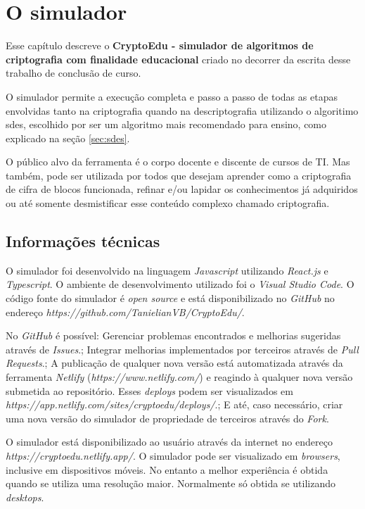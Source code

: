 \chapter{O simulador}
\label{char:ferrdesenvolvida}
Esse capítulo descreve o \textbf{CryptoEdu - simulador de algoritmos de criptografia com finalidade educacional} criado no decorrer da escrita desse trabalho de conclusão de curso.

O simulador permite a execução completa e passo a passo de todas as etapas envolvidas tanto na criptografia quando na descriptografia utilizando o algoritimo \acrfull{sdes}, escolhido por ser um algoritmo mais recomendado para ensino, como explicado na seção \ref{sec:sdes}.

O público alvo da ferramenta é o corpo docente e discente de cursos de TI. Mas também, pode ser utilizada por todos que desejam aprender como a criptografia de cifra de blocos funcionada, refinar e/ou lapidar os conhecimentos já adquiridos ou até somente desmistificar esse conteúdo complexo chamado criptografia.

\section{Informações técnicas}

O simulador foi desenvolvido na linguagem \textit{Javascript} utilizando \textit{React.js} e \textit{Typescript}. O ambiente de desenvolvimento utilizado foi o \textit{Visual Studio Code}. O código fonte do simulador é \textit{open source} e está disponibilizado no \textit{GitHub} no endereço \textit{https://github.com/TanielianVB/CryptoEdu/}.

No \textit{GitHub} é possível: Gerenciar problemas encontrados e melhorias sugeridas através de \textit{Issues}.; Integrar melhorias implementados por terceiros através de \textit{Pull Requests}.; A publicação de qualquer nova versão está automatizada através da ferramenta \textit{Netlify} (\textit{https://www.netlify.com/}) e reagindo à qualquer nova versão submetida ao repositório. Esses \textit{deploys} podem ser visualizados em \textit{https://app.netlify.com/sites/cryptoedu/deploys/}.; E até, caso necessário, criar uma nova versão do simulador de propriedade de terceiros através do \textit{Fork}.

O simulador está disponibilizado ao usuário através da internet no endereço \textit{https://cryptoedu.netlify.app/}. O simulador pode ser visualizado em \textit{browsers}, inclusive em dispositivos móveis. No entanto a melhor experiência é obtida quando se utiliza uma resolução maior. Normalmente só obtida se utilizando \textit{desktops}.

